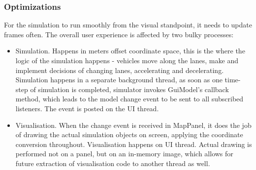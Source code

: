 \subsubsection{Optimizations}
For the simulation to run smoothly from the visual standpoint, it needs to update frames often. The overall user experience is affected by two bulky processes:
\begin{itemize}
    \item Simulation. Happens in meters offset coordinate space, this is the where the logic of the simulation happens - vehicles move along the lanes, make and implement decisions of changing lanes, accelerating and decelerating. Simulation happens in a separate background thread, as soon as one time-step of simulation is completed, simulator invokes GuiModel's callback method, which leads to the model change event to be sent to all subscribed listeners. The event is posted on the UI thread.
    \item Visualisation. When the change event is received in MapPanel, it does the job of drawing the actual simulation objects on screen, applying the coordinate conversion throughout. Visualisation happens on UI thread. Actual drawing is performed not on a panel, but on an in-memory image, which allows for future extraction of visualisation code to another thread as well.
\end{itemize}

